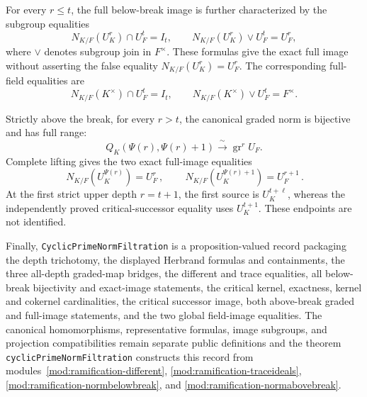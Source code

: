 \begin{theorem}
For every $r\le t$, the full below-break image is further characterized by
the subgroup equalities
\[
 N_{K/F}(U_K^r)\cap U_F^t=I_t,
 \qquad
 N_{K/F}(U_K^r)\vee U_F^t=U_F^r,
\]
where $\vee$ denotes subgroup join in $F^\times$.  These formulas give the
exact full image without asserting the false equality
$N_{K/F}(U_K^r)=U_F^r$.  The corresponding full-field equalities are
\[
 N_{K/F}(K^\times)\cap U_F^t=I_t,
 \qquad
 N_{K/F}(K^\times)\vee U_F^t=F^\times.
\]

Strictly above the break, for every $r>t$, the canonical graded norm is
bijective and has full range:
\[
 Q_K(\Psi(r),\Psi(r)+1)
 \xrightarrow{\ \sim\ }
 \operatorname{gr}^rU_F.
\]
Complete lifting gives the two exact full-image equalities
\[
 \boxed{\,N_{K/F}(U_K^{\Psi(r)})=U_F^r\,},
 \qquad
 \boxed{\,N_{K/F}(U_K^{\Psi(r)+1})=U_F^{r+1}\,}.
\]
At the first strict upper depth $r=t+1$, the first source is
$U_K^{t+\ell}$, whereas the independently proved critical-successor
equality uses $U_K^{t+1}$.  These endpoints are not identified.

Finally, \texttt{CyclicPrimeNormFiltration} is a proposition-valued record
packaging the depth trichotomy, the displayed Herbrand formulas and
containments, the three all-depth graded-map bridges, the different and
trace equalities, all below-break
bijectivity and exact-image statements, the critical kernel, exactness,
kernel and cokernel cardinalities, the critical successor image, both
above-break graded and full-image statements, and the two global field-image
equalities.  The canonical homomorphisms, representative formulas, image
subgroups, and projection compatibilities remain separate public
definitions and the theorem
\texttt{cyclicPrimeNormFiltration} constructs this record from
modules~\ref{mod:ramification-different},
\ref{mod:ramification-traceideals},
\ref{mod:ramification-normbelowbreak}, and
\ref{mod:ramification-normabovebreak}.


\end{theorem}
